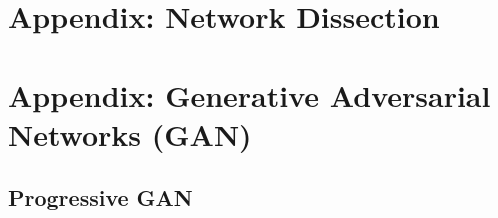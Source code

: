 \chapter{Appendix: Network Dissection}
\label{chapter:appendix1_netdissect}
\cite{net_dissect}

\chapter{Appendix: Generative Adversarial Networks (GAN)}
\label{chapter:appendix2_gan}
\cite{goodfellow2014generative}

\section{Progressive GAN}
\cite{karras2017progressive}